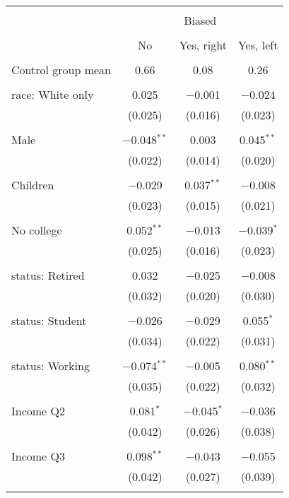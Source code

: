 
\begin{tabular}{@{\extracolsep{5pt}}lccc} 
\\[-1.8ex]\hline 
\hline \\[-1.8ex] 
 & \multicolumn{3}{c}{Biased} \\ 
\cline{2-4} 
\\[-1.8ex] & No & Yes, right & Yes, left \\ 
\hline \\[-1.8ex] 
 Control group mean & 0.66 & 0.08 & 0.26  \\ \hline \\[-1.8ex] race: White only & 0.025 & $-$0.001 & $-$0.024 \\ 
  & (0.025) & (0.016) & (0.023) \\ 
  & & & \\ 
 Male & $-$0.048$^{**}$ & 0.003 & 0.045$^{**}$ \\ 
  & (0.022) & (0.014) & (0.020) \\ 
  & & & \\ 
 Children & $-$0.029 & 0.037$^{**}$ & $-$0.008 \\ 
  & (0.023) & (0.015) & (0.021) \\ 
  & & & \\ 
 No college & 0.052$^{**}$ & $-$0.013 & $-$0.039$^{*}$ \\ 
  & (0.025) & (0.016) & (0.023) \\ 
  & & & \\ 
 status: Retired & 0.032 & $-$0.025 & $-$0.008 \\ 
  & (0.032) & (0.020) & (0.030) \\ 
  & & & \\ 
 status: Student & $-$0.026 & $-$0.029 & 0.055$^{*}$ \\ 
  & (0.034) & (0.022) & (0.031) \\ 
  & & & \\ 
 status: Working & $-$0.074$^{**}$ & $-$0.005 & 0.080$^{**}$ \\ 
  & (0.035) & (0.022) & (0.032) \\ 
  & & & \\ 
 Income Q2 & 0.081$^{*}$ & $-$0.045$^{*}$ & $-$0.036 \\ 
  & (0.042) & (0.026) & (0.038) \\ 
  & & & \\ 
 Income Q3 & 0.098$^{**}$ & $-$0.043 & $-$0.055 \\ 
  & (0.042) & (0.027) & (0.039) \\ 
  & & & \\ 

\end{tabular}

